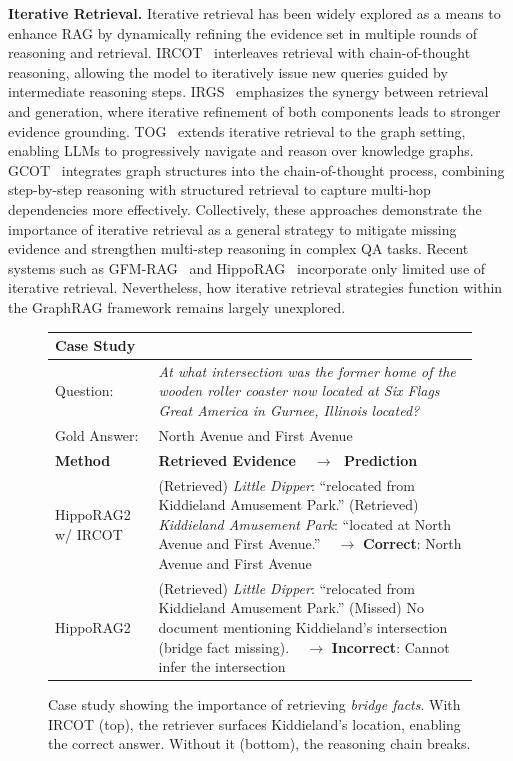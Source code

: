 \documentclass{article} %
\begin{document}
\textbf{Iterative Retrieval.} 
Iterative retrieval has been widely explored as a means to enhance RAG by dynamically refining the evidence set in multiple rounds of reasoning and retrieval. IRCOT~\citep{trivedi2022interleaving} interleaves retrieval with chain-of-thought reasoning, allowing the model to iteratively issue new queries guided by intermediate reasoning steps. IRGS~\citep{shao2023enhancing} emphasizes the synergy between retrieval and generation, where iterative refinement of both components leads to stronger evidence grounding. TOG~\citep{sun2023think} extends iterative retrieval to the graph setting, enabling LLMs to progressively navigate and reason over knowledge graphs. GCOT~\citep{jin2024graph} integrates graph structures into the chain-of-thought process, combining step-by-step reasoning with structured retrieval to capture multi-hop dependencies more effectively. Collectively, these approaches demonstrate the importance of iterative retrieval as a general strategy to mitigate missing evidence and strengthen multi-step reasoning in complex QA tasks.
Recent systems such as GFM-RAG~\citep{luo2025gfm} and HippoRAG~\citep{jimenez2024hipporag} incorporate only limited use of iterative retrieval. Nevertheless, how iterative retrieval strategies function within the GraphRAG framework remains largely unexplored.
\begin{figure}[t]
\centering
\begin{tabular}{|p{2cm}|p{11cm}|}
\hline
\multicolumn{2}{|l|}{\textbf{Case Study}} \\\hline
Question: & \textit{At what intersection was the former home of the wooden roller coaster now located at Six Flags Great America in Gurnee, Illinois located?} \\
Gold Answer: & North Avenue and First Avenue \\
\hline
\textbf{Method} & \textbf{Retrieved Evidence $\;\;\;\to\;$ Prediction} \\
\hline
HippoRAG2 w/ IRCOT & 
(Retrieved) \textit{Little Dipper}: “relocated from Kiddieland Amusement Park.” \newline
(Retrieved) \textit{Kiddieland Amusement Park}: “located at North Avenue and First Avenue.” \newline
$\;\;\;\to$ \textbf{Correct}: North Avenue and First Avenue \\
\hline
HippoRAG2 & 
(Retrieved) \textit{Little Dipper}: “relocated from Kiddieland Amusement Park.” \newline
(Missed) No document mentioning Kiddieland’s intersection (bridge fact missing). \newline
$\;\;\;\to$ \textbf{Incorrect}: Cannot infer the intersection \\
\hline
\end{tabular}
\caption{Case study showing the importance of retrieving \textit{bridge facts}. With IRCOT (top), the retriever surfaces Kiddieland’s location, enabling the correct answer. Without it (bottom), the reasoning chain breaks.}
\label{fig:case_study_bridge}
\end{figure}
\end{document}
